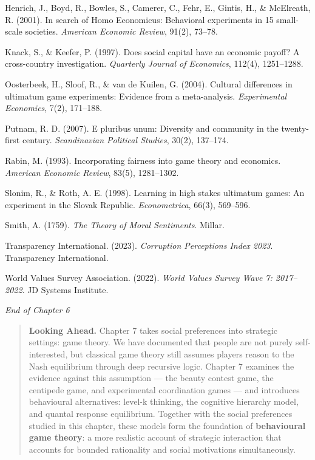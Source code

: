 \documentclass[12pt, letterpaper]{article}
\begin{document}
Henrich, J., Boyd, R., Bowles, S., Camerer, C., Fehr, E., Gintis, H., \& McElreath, R. (2001). In search of Homo Economicus: Behavioral experiments in 15 small-scale societies. \textit{American Economic Review}, 91(2), 73--78.

Knack, S., \& Keefer, P. (1997). Does social capital have an economic payoff? A cross-country investigation. \textit{Quarterly Journal of Economics}, 112(4), 1251--1288.

Oosterbeek, H., Sloof, R., \& van de Kuilen, G. (2004). Cultural differences in ultimatum game experiments: Evidence from a meta-analysis. \textit{Experimental Economics}, 7(2), 171--188.

Putnam, R. D. (2007). E pluribus unum: Diversity and community in the twenty-first century. \textit{Scandinavian Political Studies}, 30(2), 137--174.

Rabin, M. (1993). Incorporating fairness into game theory and economics. \textit{American Economic Review}, 83(5), 1281--1302.

Slonim, R., \& Roth, A. E. (1998). Learning in high stakes ultimatum games: An experiment in the Slovak Republic. \textit{Econometrica}, 66(3), 569--596.

Smith, A. (1759). \textit{The Theory of Moral Sentiments}. Millar.

Transparency International. (2023). \textit{Corruption Perceptions Index 2023}. Transparency International.

World Values Survey Association. (2022). \textit{World Values Survey Wave 7: 2017--2022}. JD Systems Institute.

\medskip

\textit{End of Chapter 6}

\medskip

\begin{quote}
\textbf{Looking Ahead.} Chapter 7 takes social preferences into strategic settings: game theory. We have documented that people are not purely self-interested, but classical game theory still assumes players reason to the Nash equilibrium through deep recursive logic. Chapter 7 examines the evidence against this assumption --- the beauty contest game, the centipede game, and experimental coordination games --- and introduces behavioural alternatives: level-k thinking, the cognitive hierarchy model, and quantal response equilibrium. Together with the social preferences studied in this chapter, these models form the foundation of \textbf{behavioural game theory}: a more realistic account of strategic interaction that accounts for bounded rationality and social motivations simultaneously.
\end{quote}
\end{document}
